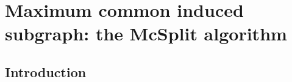 \chapter{Maximum common induced subgraph: the McSplit algorithm}
\label{c:mcsplit-i-undirected}

\newcommand{\BigO}[1]{\ensuremath{\operatorname{O}\left(#1\right)}}

\newcommand{\exampleG} {
    \tikz {
        \graph [nodes={draw, circle, minimum width=.55cm, inner sep=1pt}, circular placement, radius=0.95cm,
                clockwise=5] {
                    1,2,3,4,5;
            1--4; 1--5; 2--3; 2--5; 3--5;
        };
    }
}
\newcommand{\exampleH} {
    \tikz {
        \graph [nodes={draw, circle, minimum width=.55cm, inner sep=1pt}, circular placement, radius=0.95cm,
                clockwise=6, phase=60] {
                    a,b,c,d,e,f;
            a--b; a--c; a--e; b--d; b--f; c--d; c--e; c--f; d--f; e--f;
        };
    }
}

\newcommand{\LabelTables}[3] {
  {\small
    \centering
    \begin{minipage}[t]{.20\linewidth}
        Mapping

        \medskip

        #1
    \end{minipage}
    \quad
    \begin{minipage}[t]{0.31\linewidth}
        \centering
        Labelling of $\graphG$

        \begin{tabular}[t]{cc}
        \toprule
            Vertex & Label\\
        \midrule
            #2
        \bottomrule
        \end{tabular}
    \end{minipage}
    \quad
    \begin{minipage}[t]{0.31\linewidth}
        \centering
        Labelling of $\graphH$

        \begin{tabular}[t]{cc}
        \toprule
            Vertex & Label\\
        \midrule
            #3
        \bottomrule
        \end{tabular}
        \medskip
    \end{minipage}
  }
}


\section{Introduction}

